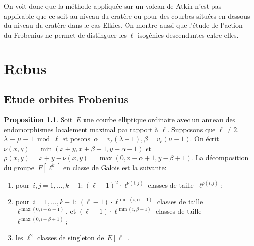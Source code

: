 \documentclass[10pt,a4paper]{book}
\theoremstyle{plain}
\theoremstyle{definition}
\theoremstyle{definition}
\theoremstyle{definition}
\newtheorem{prop}[thm]{Proposition}
\theoremstyle{definition}
\theoremstyle{remark}
\theoremstyle{remark}
\theoremstyle{definition}
\begin{document}
On voit donc que la méthode appliquée sur un volcan de Atkin n'est pas 
applicable que ce soit au niveau du cratère ou pour des courbes situées en 
dessous du niveau du cratère dans le cas Elkies. On montre aussi que l'étude de
l'action du Frobenius ne permet de distinguer les $\ell$-isogénies descendantes
entre elles.

\printnomenclature
\chapter{Rebus}
\section{Etude orbites Frobenius}
\begin{prop}\label{prop:orbites-l-torsion}
Soit~$E$ une courbe elliptique ordinaire avec un anneau des endomorphismes 
localement maximal  par rapport à $\ell$.
Supposons que $\ell \neq 2$, $\lambda \equiv \mu \equiv 1 \bmod \ell$ et posons~$\alpha = v_{\ell}(\lambda-1), \beta=v_{\ell}(\mu-1)$.
On écrit~$\nu(x, y) = \min (x+y, x+\beta-1, y+\alpha-1)$
et~$\rho(x, y) = x+y - \nu(x, y) = \max (0, x-\alpha+1, y-\beta+1)$.
La décomposition du groupe~$E[\ell^k]$ en classe de Galois est la suivante:
\begin{enumerate}
\item pour~$i, j = 1, …, k-1$:
$(\ell-1)^2 \cdot \ell^{\nu(i,j)}$ classes de taille~$\ell^{\rho(i,j)}$;
\item pour~$i = 1, …, k-1$:
$(\ell-1) \cdot \ell^{\min (i, \alpha-1)}$ classes de taille~$\ell^{\max (0, i-\alpha+1)}$, et
$(\ell-1) \cdot \ell^{\min (i, \beta-1)}$ classes de taille~$\ell^{\max (0, i-\beta+1)}$;
\item les $\ell^2$ classes de singleton de~$E[\ell]$.
\end{enumerate}
\end{prop}
\end{document}
